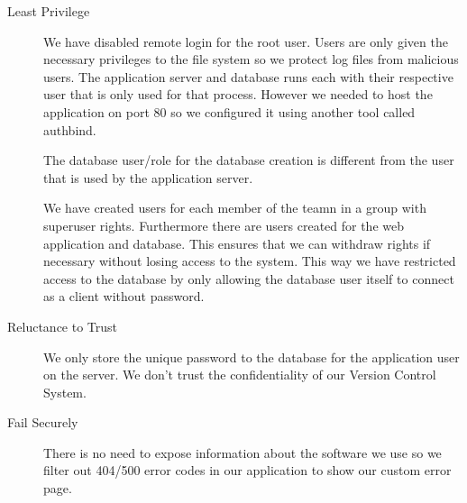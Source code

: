\documentclass[a4paper]{article}
\begin{document}
\begin{description}
\item[Least Privilege] 

We have disabled remote login for the root user. Users are only given the necessary privileges to the file system so we protect log files from malicious users.
The application server and database runs each with their respective user that is only used for that process. However we needed to host the application on port 80 so we configured it using another tool called authbind.

The database user/role for the database creation is different from the user that is used by the application server. 

We have created users for each member of the teamn in a group with superuser rights. Furthermore there are users created for the web application and database.
This ensures that we can withdraw rights if necessary without losing access to the system.
This way we have restricted access to the database by only allowing the database user itself to connect as a client without password.

\item[Reluctance to Trust]
We only store the unique password to the database for the application user on the server. We don't trust the confidentiality of our Version Control System.

\item[Fail Securely]
There is no need to expose information about the software we use so we filter out 404/500 error codes in our application to show our custom error page.
\end{description}
\end{document}
